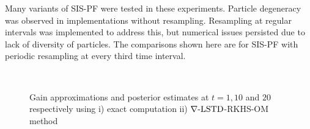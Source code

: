 Many variants of SIS-PF were tested in these experiments.
Particle degeneracy was observed in implementations without resampling.
Resampling at regular intervals was implemented to address this, but
numerical issues persisted due to lack   of diversity of particles. The comparisons
shown
here are for SIS-PF with periodic resampling at every third time interval.

\begin{figure}[htbp]
	\centering
	\mbox{
	}
	\caption{ Gain approximations and posterior estimates at $t=1,10$ and $20$ respectively using i) exact computation ii) $\nabla\text{-LSTD}$-RKHS-OM method}
	\label{fig:gain_hist_11020}
\end{figure}

